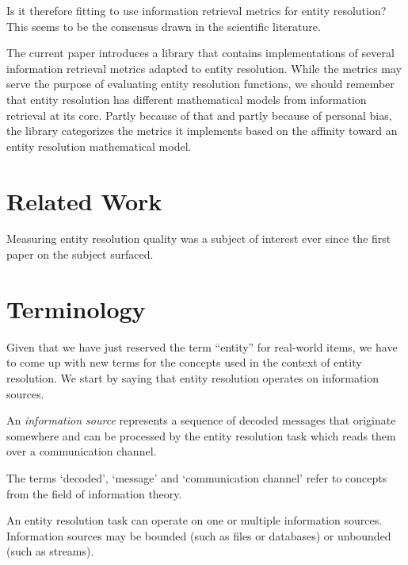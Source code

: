 \documentclass[11pt]{article}
\begin{document}
    Is it therefore fitting to use information retrieval metrics for entity
    resolution?
    This seems to be the consensus drawn in the scientific literature.

    The current paper introduces a library that contains implementations of
    several information retrieval metrics adapted to entity resolution.
    While the metrics may serve the purpose of evaluating entity resolution
    functions, we should remember that entity resolution has different
    mathematical models from information retrieval at its core.
    Partly because of that and partly because of personal bias, the library
    categorizes the metrics it implements based on the affinity toward an entity
    resolution mathematical model.

    \section{Related Work}\label{sec:related}

    Measuring entity resolution quality was a subject of interest ever since the
    first paper on the subject surfaced\cite{newcombe1959}.
    
    

    \section{Terminology}\label{sec:terminology}

    Given that we have just reserved the term ``entity'' for real-world items,
    we have to come up with new terms for the concepts used in the context of
    entity resolution.
    We start by saying that entity resolution operates on information sources.

    \begin{defn}
        An \textit{information source} represents a sequence of decoded messages
        that originate somewhere and can be processed by the entity resolution
        task which reads them over a communication channel.
    \end{defn}

    The terms `decoded', `message' and `communication channel' refer to concepts
    from the field of information theory\cite{ash2012it}.
    
    An entity resolution task can operate on one or multiple information
    sources.
    Information sources may be bounded (such as files or databases) or unbounded
    (such as streams).
    
\end{document}
